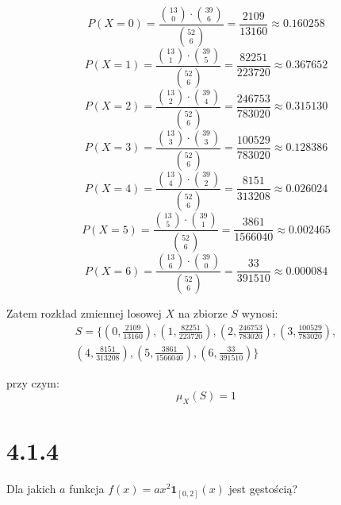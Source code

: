 \documentclass{article}
\begin{document}
\begin{equation*}
    P(X = 0) = \frac{\binom{13}{0} \cdot \binom{39}{6}}{\binom{52}{6}} = \frac{2109}{13160} \approx 0.160258
\end{equation*}
\begin{equation*}
    P(X = 1) = \frac{\binom{13}{1} \cdot \binom{39}{5}}{\binom{52}{6}} = \frac{82251}{223720} \approx 0.367652
\end{equation*}
\begin{equation*}
    P(X = 2) = \frac{\binom{13}{2} \cdot \binom{39}{4}}{\binom{52}{6}} = \frac{246753}{783020} \approx 0.315130
\end{equation*}
\begin{equation*}
    P(X = 3) = \frac{\binom{13}{3} \cdot \binom{39}{3}}{\binom{52}{6}} = \frac{100529}{783020} \approx 0.128386
\end{equation*}
\begin{equation*}
    P(X = 4) = \frac{\binom{13}{4} \cdot \binom{39}{2}}{\binom{52}{6}} = \frac{8151}{313208} \approx 0.026024
\end{equation*}
\begin{equation*}
    P(X = 5) = \frac{\binom{13}{5} \cdot \binom{39}{1}}{\binom{52}{6}} = \frac{3861}{1566040} \approx 0.002465
\end{equation*}
\begin{equation*}
    P(X = 6) = \frac{\binom{13}{6} \cdot \binom{39}{0}}{\binom{52}{6}} = \frac{33}{391510} \approx 0.000084
\end{equation*}

Zatem rozkład zmiennej losowej \(X\) na zbiorze \(S\) wynosi:
\begin{align*} 
    S = \Big\{(0, \frac{2109}{13160}), (1, \frac{82251}{223720}), (2, \frac{246753}{783020}), (3, \frac{100529}{783020}), \\
             (4, \frac{8151}{313208}), (5, \frac{3861}{1566040}), (6, \frac{33}{391510})\Big\}
\end{align*}

przy czym:
\begin{equation*}
    \mu_{X}(S) = 1
\end{equation*}

\section*{4.1.4}

\begin{center}
    Dla jakich \(a\) funkcja \(f(x) = ax^{2}\mathbf{1}_{[0,2]}(x)\) jest gęstością?
\end{center}
\end{document}
